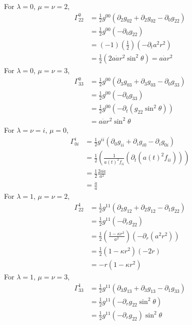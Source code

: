\begin{enumerate}[label=(\alph*)]
	For $\lambda=0$, $\mu=\nu=2$,
		\begin{align*}
		\Gamma^0_{22}  	& = \frac{1}{2} g^{00} ( \partial_2 g_{02} + \partial_2 g_{02} - \partial_0 g_{22} ) 	\\
						& = \frac{1}{2} g^{00}(- \partial_0 g_{22}) \\
						& = (-1)(\frac{1}{2})(-\partial_t a^2 r^2) \\
						& = \frac{1}{2}(2a \dot{a} r^2 \sin^2{\theta}) = a \dot{a}r^2
		\end{align*}
	For $\lambda=0$, $\mu=\nu=3$,
		\begin{align*}
		\Gamma^0_{33}  	& = \frac{1}{2} g^{00} ( \partial_3 g_{03} + \partial_3 g_{03} - \partial_0 g_{33} ) 	\\
						& = \frac{1}{2} g^{00}(- \partial_0 g_{33}) \\
						& = \frac{1}{2} g^{00}(- \partial_t (g_{22}\sin^2{\theta})) \\
						& =a \dot{a}r^2 \sin^2{\theta}
		\end{align*}		
	For $\lambda=\nu=i$, $\mu=0$,
		\begin{align*}
		\Gamma^i_{0i}  	& = \frac{1}{2} g^{ii} ( \partial_0 g_{ii} + \partial_i g_{i0} - \partial_i g_{0i} ) 	\\
						& = \frac{1}{2} (\frac{1}{a(t)^2f_{ii}} (\partial_t(a(t)^2f_{ii})) )\\
						& = \frac{1}{2} \frac{2a\dot{a}}{a^2} \\
						& = \frac{\dot{a}}{a}
		\end{align*}		
	For $\lambda=1$, $\mu=\nu=2$,
		\begin{align*}
		\Gamma^1_{22}  	& = \frac{1}{2} g^{11} ( \partial_2 g_{12} + \partial_2 g_{12} - \partial_1 g_{22}) 	\\
						& = \frac{1}{2} g^{11} (- \partial_r g_{22}) \\
						& =	\frac{1}{2} (\frac{1-\kappa r^2}{a^2} )(-\partial_r (a^2 r^2)) \\
						& = \frac{1}{2} (1-\kappa r^2)(-2r) \\
						& = -r(1-\kappa r^2)
		\end{align*}		
	For $\lambda=1$, $\mu=\nu=3$,
		\begin{align*}
		\Gamma^1_{33}  	& = \frac{1}{2} g^{11} ( \partial_3 g_{13} + \partial_3 g_{13} - \partial_1 g_{33}) 	\\
						& = \frac{1}{2} g^{11} (- \partial_r g_{22}\sin^2{\theta})\\
						& = \frac{1}{2} g^{11} (- \partial_r g_{22}) \sin^2{\theta} \\

\end{align*}
\end{enumerate}
